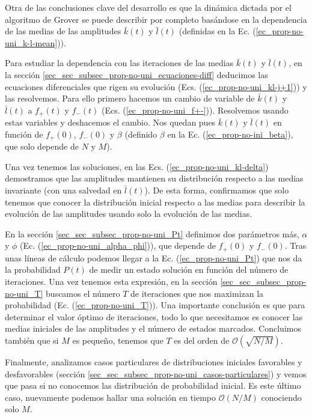 \documentclass[a4paper,11pt]{book} %
\numberwithin{equation}{chapter}
\begin{document}
Otra de las conclusiones clave del desarrollo es que la dinámica dictada por el algoritmo de Grover se puede describir por completo basándose en la dependencia de las medias de las amplitudes $\bar{k}(t)$ y $\bar{l}(t)$ (definidas en la Ec. (\ref{ec_prop-no-uni_k-l-mean})).

Para estudiar la dependencia con las iteraciones de las medias $\bar{k}(t)$ y $\bar{l}(t)$, en la sección \ref{sec_sec_subsec_prop-no-uni_ecuaciones-diff} deducimos las ecuaciones diferenciales que rigen su evolución (Ecs. (\ref{ec_prop-no-uni_kl-j+1})) y las resolvemos. Para ello primero hacemos un cambio de variable de $\bar{k}(t)$ y $\bar{l}(t)$ a $f_+(t)$ y $f_-(t)$ (Ecs. (\ref{ec_prop-no-uni_f+-})). Resolvemos usando estas variables y deshacemos el cambio. Nos quedan pues $\bar{k}(t)$ y $\bar{l}(t)$ en función de $f_+(0)$, $f_-(0)$ y $\beta$ (definido $\beta$ en la Ec. (\ref{ec_prop-no-ini_beta}), que solo depende de $N$ y $M$). 

Una vez tenemos las soluciones, en las Ecs. (\ref{ec_prop-no-uni_kl-delta}) demostramos que las amplitudes mantienen su distribución respecto a las medias invariante (con una salvedad en $\bar{l}(t)$). De esta forma, confirmamos que solo tenemos que conocer la distribución inicial respecto a las medias para describir la evolución de las amplitudes usando solo la evolución de las medias. 

En la sección \ref{sec_sec_subsec_prop-no-uni_Pt}  definimos dos parámetros más, $\alpha$ y $\phi$ (Ec. (\ref{ec_prop-no-uni_alpha_phi})), que depende de $f_+(0)$ y $f_-(0)$. Tras unas líneas de cálculo podemos llegar a la Ec. (\ref{ec_prop-no-uni_Pt}) que nos da la probabilidad $P(t)$ de medir un estado solución en función del número de iteraciones. Una vez tenemos esta expresión, en la sección \ref{sec_sec_subsec_prop-no-uni_T} buscamos el número $T$ de iteraciones que nos maximizan la probabilidad (Ec. (\ref{ec_prop-no-uni_T})). Una importante conclusión es que para determinar el valor óptimo de iteraciones, todo lo que necesitamos es conocer las medias iniciales de las amplitudes y el número de estados marcados. Concluimos también que si $M$ es pequeño, tenemos que $T$ es del orden de $\mathcal{O}(\sqrt{N/M})$.

Finalmente, analizamos casos particulares de distribuciones iniciales favorables y desfavorables (sección \ref{sec_sec_subsec_prop-no-uni_casos-particulares}) y vemos que pasa si no conocemos las distribución de probabilidad inicial. Es este último caso, nuevamente podemos hallar una solución en tiempo $\mathcal{O}(N/M)$ conociendo solo $M$. 
\end{document}
